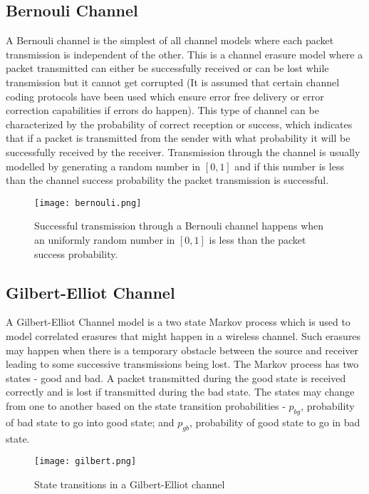 \subsection{Bernouli Channel}

A Bernouli channel is the simplest of all channel models where each packet transmission is independent of the other. This is a channel erasure model where a packet transmitted can either be successfully received or can be lost while transmission but it cannot get corrupted (It is assumed that certain channel coding protocols have been used which ensure error free delivery or error correction capabilities if errors do happen). This type of channel can be characterized by the probability of correct reception or success, which indicates that if a packet is transmitted from the sender with what probability it will be successfully received by the receiver. Transmission through the channel is usually modelled by generating a random number in $[0, 1]$ and if this number is less than the channel success probability the packet transmission is successful.
\\

\begin{figure*}[h]
	\centering
	\texttt{[image: bernouli.png]}
	\caption{Successful transmission through a Bernouli channel happens when an uniformly random number in $[0,1]$ is less than the packet success probability.}
	\label{fig-1.2}
\end{figure*}


\subsection{Gilbert-Elliot Channel}

A Gilbert-Elliot Channel model is a two state Markov process which is used to model correlated erasures that might happen in a wireless channel. Such erasures may happen when there is a temporary obstacle between the source and receiver leading to some successive transmissions being lost. The Markov process has two states - good and bad. A packet transmitted during the good state is received correctly and is lost if transmitted during the bad state. The states may change from one to another based on the state transition probabilities - $p_{bg}$, probability of bad state to go into good state; and $p_{gb}$, probability of good state to go in bad state.
\\

\begin{figure*}[h]
	\centering
	\texttt{[image: gilbert.png]}
	\caption{State transitions in a Gilbert-Elliot channel}
	\label{fig-1.3}
\end{figure*}

